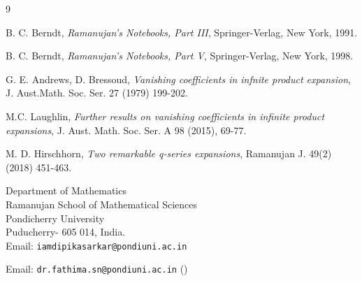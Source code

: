\documentclass[11pt,a4paper]{article}
\numberwithin{equation}{section}
\theoremstyle{plain}
\begin{document}
    \begin{thebibliography}{9}
		
		B. C. Berndt,
		\textit{Ramanujan's Notebooks, Part III},
		Springer-Verlag, New York, 1991.
		
		B. C. Berndt,
		\textit{Ramanujan's Notebooks, Part V},
		Springer-Verlag, New York, 1998.
		
		G. E. Andrews, D. Bressoud,
		\textit{Vanishing coefficients in infnite product expansion},
		J. Aust.Math. Soc. Ser. 27 (1979) 199-202.
		
		M.C. Laughlin,
		\textit{Further results on vanishing coefficients in infinite product expansions},
		J. Aust. Math. Soc. Ser. A {98} (2015), 69-77.

        M. D. Hirschhorn, 
        \textit{Two remarkable q-series expansions},
        Ramanujan J. 49(2) (2018) 451-463.
	\end{thebibliography}
	
	\bigskip
	\bigskip
	
	\noindent
	Department of Mathematics\\
	Ramanujan School of Mathematical Sciences\\
	Pondicherry University\\
	Puducherry- 605 014, India.\\
	
	
	\noindent Email: \texttt{iamdipikasarkar@pondiuni.ac.in}
	
	\noindent	Email: \texttt{dr.fathima.sn@pondiuni.ac.in} (\Letter)
	
\end{document}
